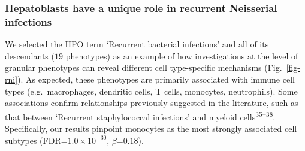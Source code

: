 \documentclass[
]{article}
\begin{document}
\begin{figure}[H]


\caption{\label{fig-ontology-lvl}}

\end{figure}%

\subsubsection{Hepatoblasts have a unique role in recurrent Neisserial
infections}\label{hepatoblasts-have-a-unique-role-in-recurrent-neisserial-infections}

We selected the HPO term `Recurrent bacterial infections' and all of its
descendants (\(19\) phenotypes) as an example of how investigations at
the level of granular phenotypes can reveal different cell type-specific
mechanisms (Fig.~\ref{fig-rni}). As expected, these phenotypes are
primarily associated with immune cell types (e.g.~macrophages, dendritic
cells, T cells, monocytes, neutrophils). Some associations confirm
relationships previously suggested in the literature, such as that
between `Recurrent staphylococcal infections' and myeloid
cells\textsuperscript{35--38}. Specifically, our results pinpoint
monocytes as the most strongly associated cell subtypes
(FDR=\(1.0 \times 10^{-30}\), \(\beta\)=\(0.18\)).
\end{document}
